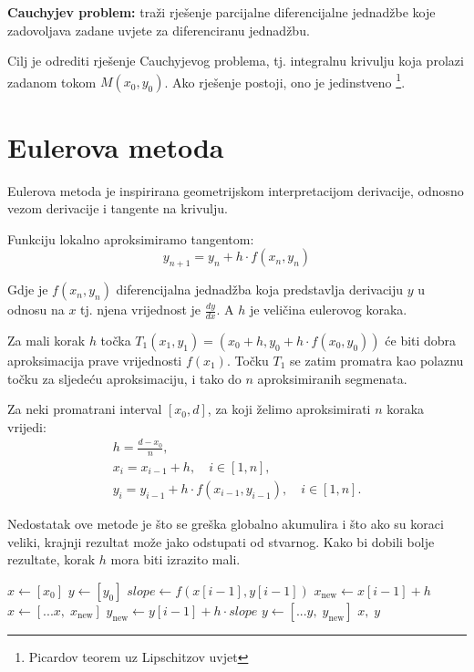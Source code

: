 \textbf{Cauchyjev problem:} traži rješenje parcijalne diferencijalne jednadžbe
koje zadovoljava zadane uvjete za diferenciranu jednadžbu.

Cilj je odrediti rješenje Cauchyjevog problema, tj. integralnu krivulju koja
prolazi zadanom tokom $M(x_0,y_0)$. Ako rješenje postoji, ono je jedinstveno
\footnote{Picardov teorem uz Lipschitzov uvjet}.

\section{Eulerova metoda}

Eulerova metoda je inspirirana geometrijskom interpretacijom derivacije, odnosno
vezom derivacije i tangente na krivulju.

Funkciju lokalno aproksimiramo tangentom:
$$
y_{n+1} = y_n + h\cdot f(x_n, y_n)
$$

Gdje je $f(x_n, y_n)$ diferencijalna jednadžba koja predstavlja derivaciju $y$ u
odnosu na $x$ tj. njena vrijednost je $\frac{dy}{dx}$. A $h$ je veličina
eulerovog koraka.

Za mali korak $h$ točka $T_1(x_1, y_1) = (x_0 + h, y_0 + h \cdot f(x_0, y_0))$
će biti dobra aproksimacija prave vrijednosti $f(x_1)$. Točku $T_1$ se zatim
promatra kao polaznu točku za sljedeću aproksimaciju, i tako do $n$
aproksimiranih segmenata.

Za neki promatrani interval $[x_0, d]$, za koji želimo aproksimirati $n$ koraka
vrijedi:
\begin{gather*}
    h=\frac{d - x_0}{n},\\
    x_i = x_{i-1} + h,\quad i \in [1, n],\\
    y_i = y_{i-1} + h\cdot f(x_{i-1}, y_{i-1}),\quad i \in [1, n].
\end{gather*}

Nedostatak ove metode je što se greška globalno akumulira i što ako su koraci
veliki, krajnji rezultat može jako odstupati od stvarnog. Kako bi dobili bolje
rezultate, korak $h$ mora biti izrazito mali.

\smallskip

\begin{algorithmic}
    \State $x \gets [x_0]$
    \State $y \gets [y_0]$
        \State $slope \gets f(x[i-1], y[i-1])$
        \State $x_{\text{new}} \gets x[i-1] + h$
        \State $x \gets [...x,\;x_{\text{new}}]$
        \State $y_{\text{new}} \gets y[i-1] + h \cdot slope$
        \State $y \gets [...y,\;y_{\text{new}}]$
    \EndFor
    \State \Return $x,\;y$
\EndFunction
\end{algorithmic}

